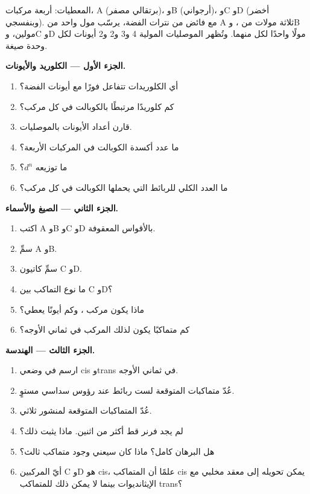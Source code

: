\begin{problem}
\label{pb:b2:coordination-complexes:1}
المعطيات: أربعة مركبات، A  (برتقالي مصفر)، وB 
(أرجواني)، وC وD  (أخضر وبنفسجي). مع فائض من نترات الفضة،
يرسّب مول واحد من A ثلاثة مولات من ، وB مولين، وC وD مولًا واحدًا لكل منهما. 
وتُظهر الموصليات المولية 4 و3 و2 و2 أيونات لكل وحدة صيغة.

\medskip
\noindent\textbf{الجزء الأول --- الكلوريد والأيونات.}
\begin{enumerate}
  \item أي الكلوريدات تتفاعل فورًا مع أيونات الفضة؟
  \item كم كلوريدًا مرتبطًا بالكوبالت في كل مركب؟
  \item قارن أعداد الأيونات بالموصليات.
  \item ما عدد أكسدة الكوبالت في المركبات الأربعة؟
  \item ما توزيعه $d^n$؟
  \item ما العدد الكلي للربائط التي يحملها الكوبالت في كل مركب؟
\end{enumerate}

\medskip
\noindent\textbf{الجزء الثاني --- الصيغ والأسماء.}
\begin{enumerate}[resume]
  \item اكتب A وB وC وD بالأقواس المعقوفة.
  \item سمِّ A وB.
  \item سمِّ كاتيون C وD.
  \item ما نوع التماكب بين C وD؟
  \item ماذا يكون مركب ، وكم أيونًا يعطي؟
  \item كم متماكبًا يكون لذلك المركب في ثماني الأوجه؟
\end{enumerate}

\medskip
\noindent\textbf{الجزء الثالث --- الهندسة.}
\begin{enumerate}[resume]
  \item ارسم \ce{[CoCl2(NH3)4]+} في وضعي cis وtrans في ثماني الأوجه.
  \item عُدّ متماكبات \ce{[CoCl2(NH3)4]+} المتوقعة لست ربائط عند
        رؤوس سداسي مستوٍ.
  \item عُدّ المتماكبات المتوقعة لمنشور ثلاثي.
  \item لم يجد فرنر قط أكثر من اثنين. ماذا يثبت ذلك؟
  \item هل البرهان كامل؟ ماذا كان سيعني وجود متماكب ثالث؟
  \item أيّ المركبين C وD هو cis، علمًا أن المتماكب cis يمكن تحويله إلى
        معقد مخلبي مع الإيثانديوات بينما لا يمكن ذلك للمتماكب trans؟
\end{enumerate}


\end{problem}
